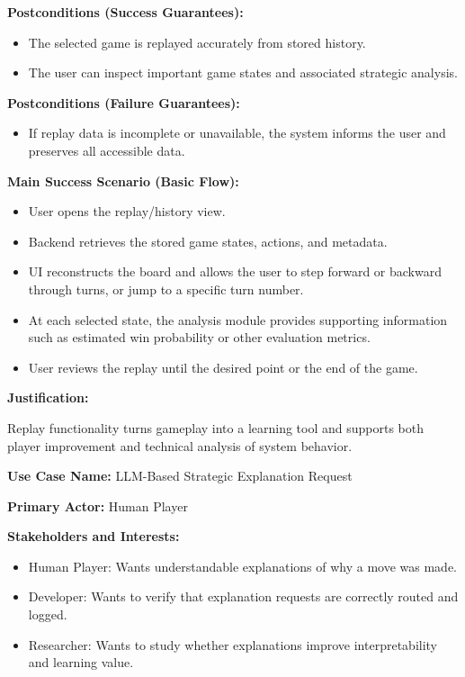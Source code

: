 \documentclass{article}
\begin{document}
\noindent\textbf{Postconditions (Success Guarantees):}
\begin{itemize}
    \item The selected game is replayed accurately from stored history.
    \item The user can inspect important game states and associated strategic analysis.
\end{itemize}

\noindent\textbf{Postconditions (Failure Guarantees):}
\begin{itemize}
    \item If replay data is incomplete or unavailable, the system informs the user and preserves all accessible data.
\end{itemize}

\noindent\textbf{Main Success Scenario (Basic Flow):}
\begin{itemize}
    \item User opens the replay/history view.
    \item Backend retrieves the stored game states, actions, and metadata.
    \item UI reconstructs the board and allows the user to step forward or backward through turns, or jump to a specific turn number.
    \item At each selected state, the analysis module provides supporting information such as estimated win probability or other evaluation metrics.
    \item User reviews the replay until the desired point or the end of the game.
\end{itemize}

\noindent\textbf{Justification:}

Replay functionality turns gameplay into a learning tool and supports both player improvement and technical analysis of system behavior.

\vspace{1em}

\noindent\textbf{Use Case Name:} LLM-Based Strategic Explanation Request

\noindent\textbf{Primary Actor:} Human Player

\noindent\textbf{Stakeholders and Interests:}
\begin{itemize}
    \item Human Player: Wants understandable explanations of why a move was made.
    \item Developer: Wants to verify that explanation requests are correctly routed and logged.
    \item Researcher: Wants to study whether explanations improve interpretability and learning value.
\end{itemize}
\end{document}

